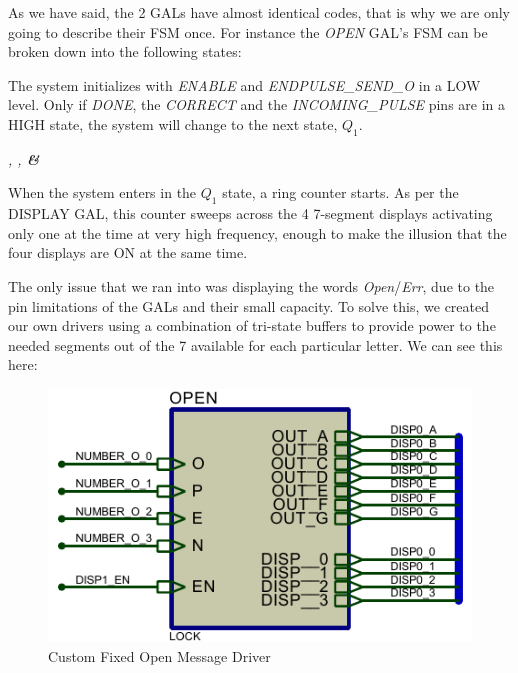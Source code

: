 As we have said, the 2 GALs have almost identical codes, that is why we are only going to describe their FSM once. For instance the \textit{OPEN} GAL's FSM can be broken down into the following states:\medskip

\hspace{0.4cm}
\textit{} \medskip

The system initializes with \textit{ENABLE} and \textit{ENDPULSE\_SEND\_O} in a LOW level.
Only if \textit{DONE},  the \textit{CORRECT} and the \textit{INCOMING\_PULSE} pins are in a HIGH state, the system will change to the next state, \textit{$Q_1$}.\medskip


\textit{, ,  \textbf{\&} }
\medskip

When the system enters in the \textit{$Q_1$} state, a ring counter starts. As per the DISPLAY GAL, this counter sweeps across the 4 7-segment displays activating only one at the time at very high frequency, enough to make the illusion that the four displays are ON at the same time.\medskip

\clearpage

The only issue that we ran into was displaying the words \textit{Open}/\textit{Err}, due to the pin limitations of the GALs and their small capacity. To solve this, we created our own drivers using a combination of tri-state buffers to provide power to the needed segments out of the 7 available for each particular letter. We can see this here: \medskip 

\begin{figure}[H]
    \centering
    \includegraphics[scale = 1]{Graphics/OPEN-ERROR/OPEN-PARENT.PDF}
    \caption{Custom Fixed Open Message Driver}
    \label{fig:OPEN_DRIVER_PARENT}
\end{figure}

